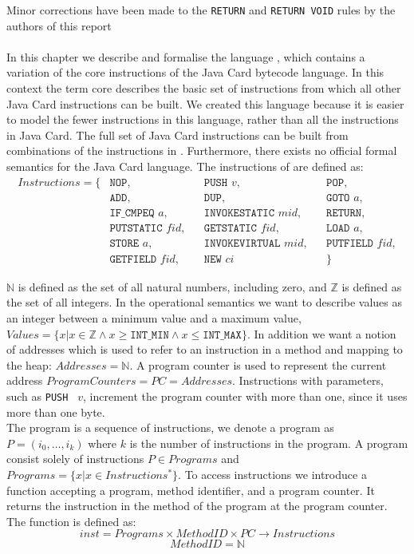 Minor corrections have been made to the \texttt{RETURN} and \texttt{RETURN VOID} rules by the authors of this report\\\\
\label{sec:semintro}
In this chapter we describe and formalise the language \jcl, which contains a variation of the core instructions of the Java Card bytecode language. In this context the term core describes the basic set of instructions from which all other Java Card instructions can be built. 
We created this language because it is easier to model the fewer instructions in this language, rather than all the instructions in Java Card.
The full set of Java Card instructions can be built from combinations of the instructions in \jcl.
Furthermore, there exists no official formal semantics for the Java Card language.
The instructions of \jcl are defined as:
\begin{align*}
  Instructions = \{
  & \texttt{NOP}, && \texttt{PUSH } v, && \texttt{POP}, \\ 
  & \texttt{ADD}, && \texttt{DUP}, && \texttt{GOTO } a, \\ 
  & \texttt{IF\_CMPEQ } a, && \texttt{INVOKESTATIC } mid, && \texttt{RETURN},\\ 
  & \texttt{PUTSTATIC } fid, && \texttt{GETSTATIC } fid, && \texttt{LOAD } a, \\
  & \texttt{STORE } a, && \texttt{INVOKEVIRTUAL } mid, && \texttt{PUTFIELD } fid,\\ 
  & \texttt{GETFIELD } fid, && \texttt{NEW } ci && \}
\end{align*}

$\mathbb{N}$ is defined as the set of all natural numbers, including zero, and $\mathbb{Z}$ is defined as the set of all integers.
In the operational semantics we want to describe values as an integer between a minimum value and a maximum value, $Values = \{ x | x \in \mathbb{Z} \wedge x \geq \texttt{INT\_MIN} \wedge x \leq \texttt{INT\_MAX} \}$.
In addition we want a notion of addresses which is used to refer to an instruction in a method and mapping to the heap: $Addresses  = \mathbb{N}$.
A program counter is used to represent the current address $ProgramCounters = PC = Addresses$. Instructions with parameters, such as \texttt{PUSH } $v$, increment the program counter with more than one, since it uses more than one byte. \\

The program is a sequence of instructions, we denote a program as $P = (i_0, \ldots, i_k)$ where $k$ is the number of instructions in the program. 
A program consist solely of instructions $P \in Programs$ and $Programs =  \{ x | x \in Instructions^{*} \}$.
To access instructions we introduce a function accepting a program, method identifier, and a program counter. 
It returns the instruction in the method of the program at the program counter.
The function is defined as:
$$inst = Programs \times MethodID \times PC \to   Instructions$$
$$MethodID = \mathbb{N}$$

